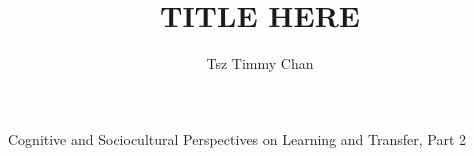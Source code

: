 \documentclass{TC}
\title{TITLE HERE}	%
\author{Tsz Timmy Chan}	%
\begin{document}
Cognitive and Sociocultural Perspectives on Learning and Transfer, Part 2
\end{document}
